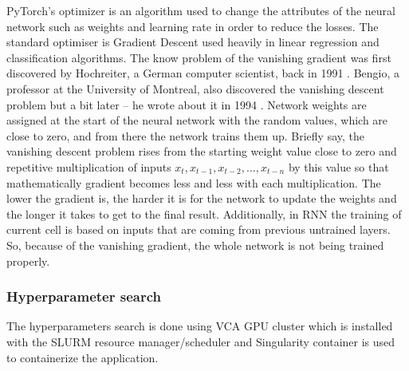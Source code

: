 PyTorch's optimizer is an algorithm used to change the attributes of the neural network such as weights and learning rate in order to reduce the losses. The standard optimiser is Gradient Descent used heavily in linear regression and classification algorithms. The know problem of the vanishing gradient was first discovered by Hochreiter, a German computer scientist, back in 1991 \cite{lstm_orig}. Bengio, a professor at the University of Montreal, also discovered the vanishing descent problem but a bit later – he wrote about it in 1994 \cite{rnn_difficults}. Network weights are assigned at the start of the neural network with the random values, which are close to zero, and from there the network trains them up. Briefly say, the vanishing descent problem rises from the starting weight value close to zero and repetitive multiplication of inputs $x_t, x_{t-1}, x_{t-2},...,x_{t-n}$ by this value so that mathematically gradient becomes less and less with each multiplication. The lower the gradient is, the harder it is for the network to update the weights and the longer it takes to get to the final result. Additionally, in RNN the training of current cell is based on inputs that are coming from previous untrained layers. So, because of the vanishing gradient, the whole network is not being trained properly.


\subsubsection{Hyperparameter search}
\label{sec:impl:model:dev:search}

The hyperparameters search is done using VCA GPU cluster which is installed with the SLURM resource manager/scheduler and Singularity container is used to containerize the application. 
